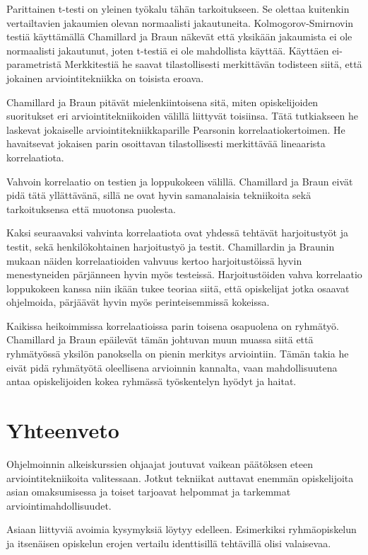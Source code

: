 \documentclass[finnish]{../tktltiki2}
\theoremstyle{definition}
\theoremstyle{remark}
\begin{document}
Parittainen t-testi on yleinen työkalu tähän tarkoitukseen. Se olettaa kuitenkin vertailtavien jakaumien olevan normaalisti jakautuneita. Kolmogorov-Smirnovin testiä käyttämällä Chamillard ja Braun näkevät että yksikään jakaumista ei ole normaalisti jakautunut, joten t-testiä ei ole mahdollista käyttää. Käyttäen ei-parametristä Merkkitestiä he saavat tilastollisesti merkittävän todisteen siitä, että jokainen arviointitekniikka on toisista eroava.

Chamillard ja Braun pitävät mielenkiintoisena sitä, miten opiskelijoiden suoritukset eri arviointitekniikoiden välillä liittyvät toisiinsa. Tätä tutkiakseen he laskevat jokaiselle arviointitekniikkaparille Pearsonin korrelaatiokertoimen. He havaitsevat jokaisen parin osoittavan tilastollisesti merkittävää lineaarista korrelaatiota.

Vahvoin korrelaatio on testien ja loppukokeen välillä. Chamillard ja Braun eivät pidä tätä yllättävänä, sillä ne ovat hyvin samanalaisia tekniikoita sekä tarkoituksensa että muotonsa puolesta.

Kaksi seuraavaksi vahvinta korrelaatiota ovat yhdessä tehtävät harjoitustyöt ja testit, sekä henkilökohtainen harjoitustyö ja testit. Chamillardin ja Braunin mukaan näiden korrelaatioiden vahvuus kertoo harjoitustöissä hyvin menestyneiden pärjänneen hyvin myös testeissä. Harjoitustöiden vahva korrelaatio loppukokeen kanssa niin ikään tukee teoriaa siitä, että opiskelijat jotka osaavat ohjelmoida, pärjäävät hyvin myös perinteisemmissä kokeissa.

Kaikissa heikoimmissa korrelaatioissa parin toisena osapuolena on ryhmä\-työ. Chamillard ja Braun epäilevät tämän johtuvan muun muassa siitä että ryhmätyössä yksilön panoksella on pienin merkitys arviointiin. Tämän takia he eivät pidä ryhmätyötä oleellisena arvioinnin kannalta, vaan mahdollisuutena antaa opiskelijoiden kokea ryhmässä työskentelyn hyödyt ja haitat.

\section{Yhteenveto}

Ohjelmoinnin alkeiskurssien ohjaajat joutuvat vaikean päätöksen eteen arviointitekniikoita valitessaan. Jotkut tekniikat auttavat enemmän opiskelijoita asian omaksumisessa ja toiset tarjoavat helpommat ja tarkemmat arviointimahdollisuudet.

Asiaan liittyviä avoimia kysymyksiä löytyy edelleen. Esimerkiksi ryhmä\-opiskelun ja itsenäisen opiskelun erojen vertailu identtisillä tehtävillä olisi valaisevaa.




\end{document}
